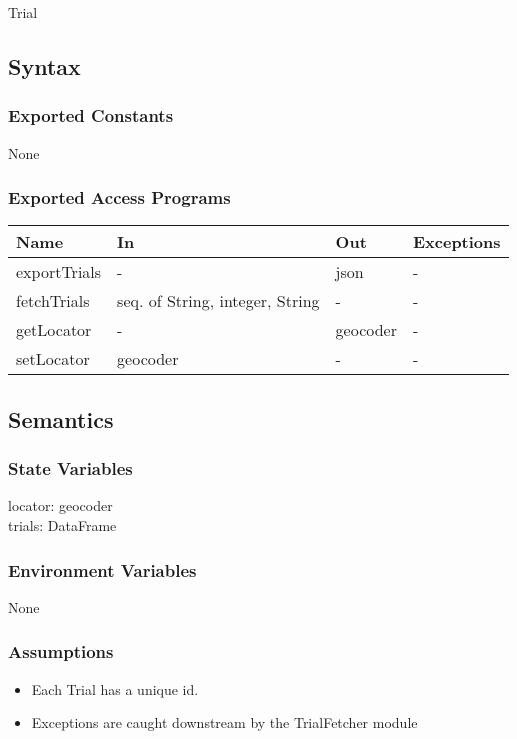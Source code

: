 \documentclass[12pt, titlepage]{article}
\begin{document}
Trial

\subsection{Syntax}

\subsubsection{Exported Constants}
None

\subsubsection{Exported Access Programs}

\begin{center}
\begin{tabular}{p{4cm} p{4cm} p{4cm} p{4cm}}
\hline
\textbf{Name} & \textbf{In} & \textbf{Out} & \textbf{Exceptions} \\
\hline
exportTrials & - & json & - \\
\hline
fetchTrials & seq. of String, integer, String & - & - \\
\hline
getLocator & - & geocoder & - \\
\hline
setLocator & geocoder & - & - \\
\hline
\end{tabular}
\end{center}

\subsection{Semantics}

\subsubsection{State Variables}
locator: geocoder \\
trials: DataFrame

\subsubsection{Environment Variables}
None

\subsubsection{Assumptions}
\begin{itemize}
  \item Each Trial has a unique id.
  \item Exceptions are caught downstream by the TrialFetcher module
\end{itemize}
\end{document}
